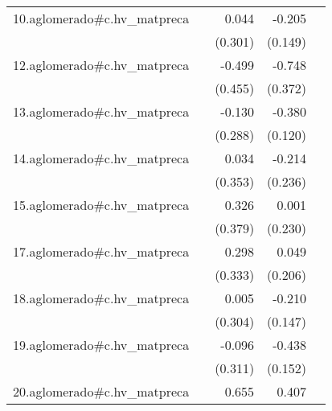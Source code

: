 {\begin{longtable}{l*{4}{D{.}{.}{-1}}}
\addlinespace
10.aglomerado#c.hv\_matpreca&                     &       0.044         &      -0.205         &                     \\
            &                     &     (0.301)         &     (0.149)         &                     \\
\addlinespace
12.aglomerado#c.hv\_matpreca&                     &      -0.499         &      -0.748\sym{*}  &                     \\
            &                     &     (0.455)         &     (0.372)         &                     \\
\addlinespace
13.aglomerado#c.hv\_matpreca&                     &      -0.130         &      -0.380\sym{**} &                     \\
            &                     &     (0.288)         &     (0.120)         &                     \\
\addlinespace
14.aglomerado#c.hv\_matpreca&                     &       0.034         &      -0.214         &                     \\
            &                     &     (0.353)         &     (0.236)         &                     \\
\addlinespace
15.aglomerado#c.hv\_matpreca&                     &       0.326         &       0.001         &                     \\
            &                     &     (0.379)         &     (0.230)         &                     \\
\addlinespace
17.aglomerado#c.hv\_matpreca&                     &       0.298         &       0.049         &                     \\
            &                     &     (0.333)         &     (0.206)         &                     \\
\addlinespace
18.aglomerado#c.hv\_matpreca&                     &       0.005         &      -0.210         &                     \\
            &                     &     (0.304)         &     (0.147)         &                     \\
\addlinespace
19.aglomerado#c.hv\_matpreca&                     &      -0.096         &      -0.438\sym{**} &                     \\
            &                     &     (0.311)         &     (0.152)         &                     \\
\addlinespace
20.aglomerado#c.hv\_matpreca&                     &       0.655         &       0.407         &                     \\

\end{longtable}}
